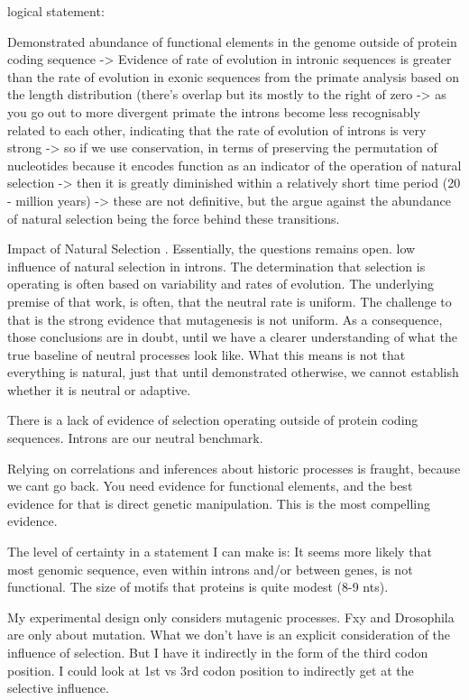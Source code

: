 logical statement: 

Demonstrated abundance of functional elements in the genome outside of protein coding sequence -> Evidence of rate of evolution in intronic sequences is greater than the rate of evolution in exonic sequences from the primate analysis based on the length distribution (there's overlap but its mostly to the right of zero -> as you go out to more divergent primate the introns become less recognisably related to each other, indicating that the rate of evolution of introns is very strong -> so if we use conservation, in terms of preserving the permutation of nucleotides because it encodes function as an indicator of the operation of natural selection -> then it is greatly diminished within a relatively short time period (20 - million years) -> these are not definitive, but the argue against the abundance of natural selection being the force behind these transitions.

Impact of Natural Selection \cite{Graur2013OnENCODE}. Essentially, the questions remains open. 
low influence of natural selection in introns. 
The determination that selection is operating is often based on variability and rates of evolution. The underlying premise of that work, is often, that the neutral rate is uniform. The challenge to that is the strong evidence that mutagenesis is not uniform. As a consequence, those conclusions are in doubt, until we have a clearer understanding of what the true baseline of neutral processes look like. What this means is not that everything is natural, just that until demonstrated otherwise, we cannot establish whether it is neutral or adaptive. 

There is a lack of evidence of selection operating outside of protein coding sequences. 
Introns are our neutral benchmark. 

Relying on correlations and inferences about historic processes is fraught, because we cant go back. You need evidence for functional elements, and the best evidence for that is direct genetic manipulation. This is the most compelling evidence.

The level of certainty in a statement I can make is:
It seems more likely that most genomic sequence, even within introns and/or between genes, is not functional. The size of motifs that proteins is quite modest (8-9 nts). 

My experimental design only considers mutagenic processes. Fxy and Drosophila are only about mutation. What we don't have is an explicit consideration of the influence of selection. But I have it indirectly in the form of the third codon position. I could look at 1st vs 3rd codon position to indirectly get at the selective influence. 

